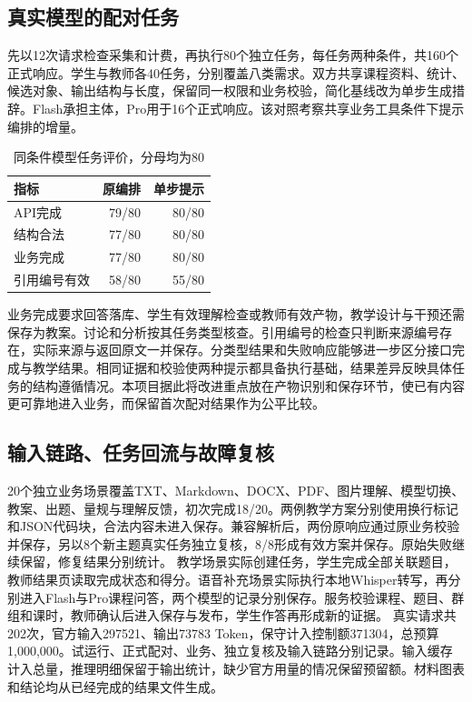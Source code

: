 \subsection{真实模型的配对任务}
先以12次请求检查采集和计费，再执行80个独立任务，每任务两种条件，共160个正式响应。学生与教师各40任务，分别覆盖八类需求。双方共享课程资料、统计、候选对象、输出结构与长度，保留同一权限和业务校验，简化基线改为单步生成措辞。Flash承担主体，Pro用于16个正式响应。该对照考察共享业务工具条件下提示编排的增量。
\begin{table}[htbp]\centering\caption{同条件模型任务评价，分母均为80}\begin{tabularx}{\linewidth}{Yrr}\toprule 指标&原编排&单步提示\\\midrule API完成&79/80&80/80\\结构合法&77/80&80/80\\业务完成&77/80&80/80\\引用编号有效&58/80&55/80\\\bottomrule\end{tabularx}\end{table}
业务完成要求回答落库、学生有效理解检查或教师有效产物，教学设计与干预还需保存为教案。讨论和分析按其任务类型核查。引用编号的检查只判断来源编号存在，实际来源与返回原文一并保存。分类型结果和失败响应能够进一步区分接口完成与教学结果。相同证据和校验使两种提示都具备执行基础，结果差异反映具体任务的结构遵循情况。本项目据此将改进重点放在产物识别和保存环节，使已有内容更可靠地进入业务，而保留首次配对结果作为公平比较。

\subsection{输入链路、任务回流与故障复核}
20个独立业务场景覆盖TXT、Markdown、DOCX、PDF、图片理解、模型切换、教案、出题、量规与理解反馈，初次完成18/20。两例教学方案分别使用换行标记和JSON代码块，合法内容未进入保存。兼容解析后，两份原响应通过原业务校验并保存，另以8个新主题真实任务独立复核，8/8形成有效方案并保存。原始失败继续保留，修复结果分别统计。
教学场景实际创建任务，学生完成全部关联题目，教师结果页读取完成状态和得分。语音补充场景实际执行本地Whisper转写，再分别进入Flash与Pro课程问答，两个模型的记录分别保存。服务校验课程、题目、群组和课时，教师确认后进入保存与发布，学生作答再形成新的证据。
真实请求共202次，官方输入297521、输出73783 Token，保守计入控制额371304，总预算1,000,000。试运行、正式配对、业务、独立复核及输入链路分别记录。输入缓存计入总量，推理明细保留于输出统计，缺少官方用量的情况保留预留额。材料图表和结论均从已经完成的结果文件生成。
